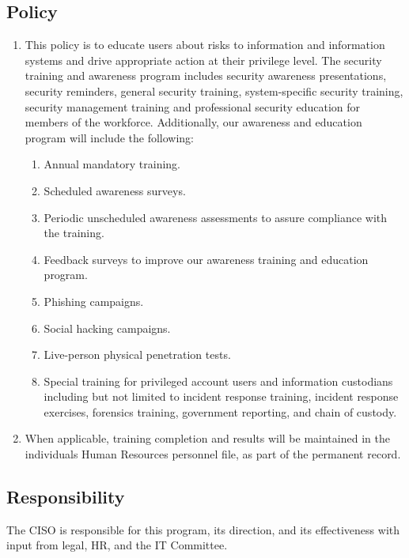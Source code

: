 \documentclass[../main.tex]{subfiles}
\begin{document}
\subsection{Policy}
\begin{enumerate}
    \item This policy is to educate users about risks to information and information systems and drive appropriate action at their privilege level.
    The \CompanyName security training and awareness program includes security awareness presentations, security reminders, general security training, system-specific security training,
    security management training and professional security education for members of the workforce. Additionally, our awareness and education program will include the following:
    \begin{enumerate}
        \item Annual mandatory training.
        \item Scheduled awareness surveys.
        \item Periodic unscheduled awareness assessments to assure compliance with the training.
        \item Feedback surveys to improve our awareness training and education program.
        \item Phishing campaigns.
        \item Social hacking campaigns.
        \item Live-person physical penetration tests.
        \item Special training for privileged account users and information custodians including but not limited to incident response training, incident response exercises,
        forensics training, government reporting, and chain of custody.
    \end{enumerate}
    \item When applicable, training completion and results will be maintained in the individuals Human Resources personnel file, as part of the permanent record.
\end{enumerate}
\subsection{Responsibility}
The CISO is responsible for this program, its direction, and its effectiveness with input from legal, HR, and the IT Committee.
\end{document}
